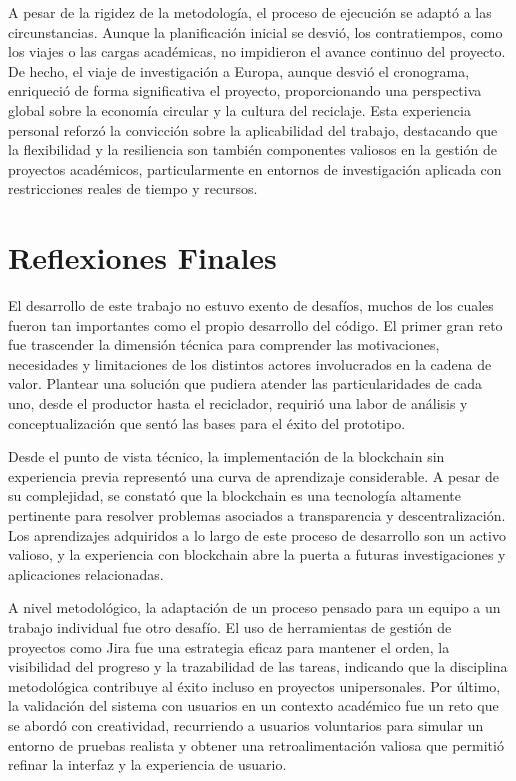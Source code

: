 A pesar de la rigidez de la metodología, el proceso de ejecución se adaptó a las circunstancias. Aunque la planificación inicial se desvió, los contratiempos, como los viajes o las cargas académicas, no impidieron el avance continuo del proyecto. De hecho, el viaje de investigación a Europa, aunque desvió el cronograma, enriqueció de forma significativa el proyecto, proporcionando una perspectiva global sobre la economía circular y la cultura del reciclaje. Esta experiencia personal reforzó la convicción sobre la aplicabilidad del trabajo, destacando que la flexibilidad y la resiliencia son también componentes valiosos en la gestión de proyectos académicos, particularmente en entornos de investigación aplicada con restricciones reales de tiempo y recursos.


\section{Reflexiones Finales}

El desarrollo de este trabajo no estuvo exento de desafíos, muchos de los cuales fueron tan importantes como el propio desarrollo del código. El primer gran reto fue trascender la dimensión técnica para comprender las motivaciones, necesidades y limitaciones de los distintos actores involucrados en la cadena de valor. Plantear una solución que pudiera atender las particularidades de cada uno, desde el productor hasta el reciclador, requirió una labor de análisis y conceptualización que sentó las bases para el éxito del prototipo.

Desde el punto de vista técnico, la implementación de la blockchain sin experiencia previa representó una curva de aprendizaje considerable. A pesar de su complejidad, se constató que la blockchain es una tecnología altamente pertinente para resolver problemas asociados a transparencia y descentralización. Los aprendizajes adquiridos a lo largo de este proceso de desarrollo son un activo valioso, y la experiencia con blockchain abre la puerta a futuras investigaciones y aplicaciones relacionadas.

A nivel metodológico, la adaptación de un proceso pensado para un equipo a un trabajo individual fue otro desafío. El uso de herramientas de gestión de proyectos como Jira fue una estrategia eficaz para mantener el orden, la visibilidad del progreso y la trazabilidad de las tareas, indicando que la disciplina metodológica contribuye al éxito incluso en proyectos unipersonales. Por último, la validación del sistema con usuarios en un contexto académico fue un reto que se abordó con creatividad, recurriendo a usuarios voluntarios para simular un entorno de pruebas realista y obtener una retroalimentación valiosa que permitió refinar la interfaz y la experiencia de usuario.

